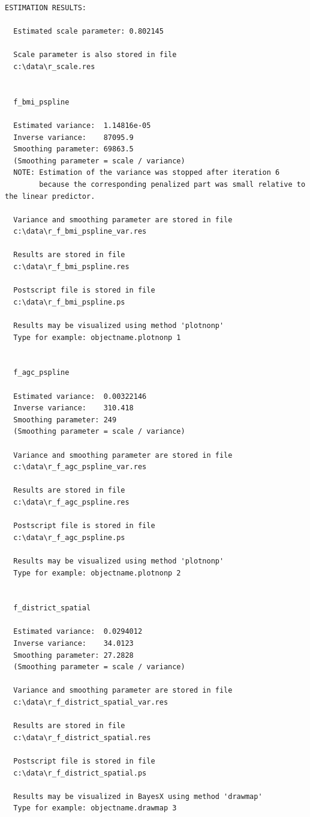 \documentclass[a4paper]{article}
\begin{document}
\footnotesize
\begin{verbatim}
ESTIMATION RESULTS:

  Estimated scale parameter: 0.802145

  Scale parameter is also stored in file
  c:\data\r_scale.res


  f_bmi_pspline

  Estimated variance:  1.14816e-05
  Inverse variance:    87095.9
  Smoothing parameter: 69863.5
  (Smoothing parameter = scale / variance)
  NOTE: Estimation of the variance was stopped after iteration 6
        because the corresponding penalized part was small relative to the linear predictor.

  Variance and smoothing parameter are stored in file
  c:\data\r_f_bmi_pspline_var.res

  Results are stored in file
  c:\data\r_f_bmi_pspline.res

  Postscript file is stored in file
  c:\data\r_f_bmi_pspline.ps

  Results may be visualized using method 'plotnonp'
  Type for example: objectname.plotnonp 1


  f_agc_pspline

  Estimated variance:  0.00322146
  Inverse variance:    310.418
  Smoothing parameter: 249
  (Smoothing parameter = scale / variance)

  Variance and smoothing parameter are stored in file
  c:\data\r_f_agc_pspline_var.res

  Results are stored in file
  c:\data\r_f_agc_pspline.res

  Postscript file is stored in file
  c:\data\r_f_agc_pspline.ps

  Results may be visualized using method 'plotnonp'
  Type for example: objectname.plotnonp 2


  f_district_spatial

  Estimated variance:  0.0294012
  Inverse variance:    34.0123
  Smoothing parameter: 27.2828
  (Smoothing parameter = scale / variance)

  Variance and smoothing parameter are stored in file
  c:\data\r_f_district_spatial_var.res

  Results are stored in file
  c:\data\r_f_district_spatial.res

  Postscript file is stored in file
  c:\data\r_f_district_spatial.ps

  Results may be visualized in BayesX using method 'drawmap'
  Type for example: objectname.drawmap 3



\end{verbatim}
\end{document}
